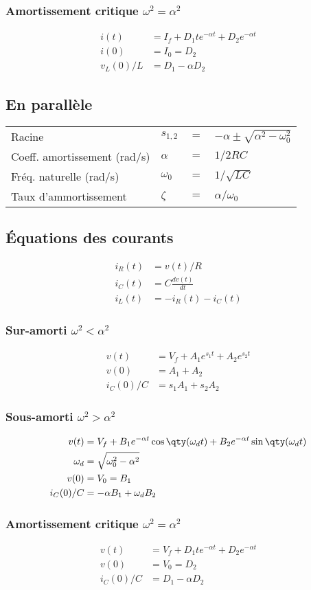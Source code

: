 \subsubsection{Amortissement critique $\omega^2 = \alpha^2$}
\begin{align*}
i(t) &= I_f + D_1 t e^{-\alpha t}+D_2 e^{-\alpha t}\\
i(0) &= I_0 = D_2\\
v_L(0)/L &= D_1 -\alpha D_2
\end{align*}

\subsection{En parallèle}
\begin{tabular}{llcl}
Racine  & \(s_{1,2}\) & \(=\) & \(-\alpha \pm \sqrt{\alpha^2-\omega_0^2} \) \\
Coeff. amortissement (rad/s)& \( \alpha\) & \(=\) & \(1/2RC \) \\
Fréq. naturelle (rad/s) & \(\omega_0\) & \(=\) & \(1/\sqrt{LC}\) \\
Taux d'ammortissement & \( \zeta\) & \(=\) & \(\alpha/\omega_0\)
\end{tabular}

\subsection{Équations des courants}
\begin{align*}
    i_R(t) &= v(t)/R \\
    i_C(t) &= C\frac{dv(t)}{dt}\\
    i_L(t) &= -i_R(t) - i_C(t)
\end{align*}

\subsubsection{Sur-amorti $\omega^2 < \alpha^2$}
\begin{align*}
v(t) &= V_f + A_1 e^{s_1 t}+A_2 e^{s_2t} \\    
v(0) &= A_1+A_2  \\
i_C(0)/C &= s_1 A_1 + s_2 A_2
\end{align*}

\subsubsection{Sous-amorti $\omega^2 > \alpha^2$}
\begin{align*}
    v(t) &= V_f + B_1 e^{-\alpha t}\cos\qty(\omega_d t)+B_2 e^{-\alpha t}\sin\qty(\omega_d t)\\
    \omega_d &= \sqrt{\omega_0^2 - \alpha^2}\\
    v(0) &= V_0 = B_1 \\
    i_C(0)/C &= -\alpha B_1+\omega_d B_2
\end{align*}

\subsubsection{Amortissement critique $\omega^2 = \alpha^2$}
\begin{align*}
    v(t) &= V_f + D_1 t e^{-\alpha t} + D_2 e^{-\alpha t}\\
    v(0) &= V_0 = D_2\\
    i_C(0)/C &= D_1 - \alpha D_2
\end{align*}